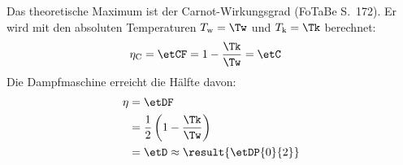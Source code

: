 Das theoretische Maximum ist der Carnot-Wirkungsgrad (FoTaBe S.~172). Er wird mit den absoluten Temperaturen $T_\text{w} = \Tw$ und $T_\text{k} = \Tk$ berechnet:
\begin{align}
 \eta_\text{C} &= \etCF = 1-\frac{\Tk}{\Tw} = \etC
\end{align}
Die Dampfmaschine erreicht die Hälfte davon:
\begin{align}
 \eta &= \etDF \\
   &= \frac{1}{2}\left(1-\frac{\Tk}{\Tw}\right) \\
   &= \etD \approx \result{\etDP{0}{2}}
\end{align}
